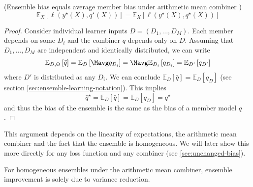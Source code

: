 \documentclass[
	twoside=false, %
]{kaobook}
\begin{document}
\begin{lemma} (Ensemble bias equals average member bias under arithmetic mean combiner \cite{louppe_UnderstandingRandomForests_2015})
  \label{thm:ensemble-bias-equals-average-bias}
$$
\mathbb{E}_{X}\left[ \ell(y^\star(X), \bar{q}^\star(X)) \right] 
= \mathbb{E}_{X}\left[ \ell(y^\star(X), q^\star(X)) \right] 
$$
\end{lemma}
\begin{proof}
Consider individual learner inputs $D = (D_{1}, \dots, D_{M})$. Each member depends on some $D_{i}$ and the combiner $\bar{q}$ depends only on $D$. Assuming that $D_{1}, \dots, D_{M}$ are independent and identically distributed, we can write
$$
\mathbb{E}_{D, \Theta}\left[ \bar{q} \right] = \mathbb{E}_{D}\left[ \Mavg q_{D_{i}} \right] = \Mavg \mathbb{E}_{D_{i}}\left[ q_{D_{i}} \right] = \mathbb{E}_{D'}\left[ q_{D'} \right]
$$
where $D'$ is distributed as any $D_{i}$. We can conclude $\mathbb{E}_{D}\left[ \bar{q} \right] = \mathbb{E}_{D}\left[ q_{D} \right]$ (see section \ref{sec:ensemble-learning-notation}).
This implies
$$
\bar{q}^\star = \mathbb{E}_{D}\left[ \bar{q} \right]  = \mathbb{E}_{D}\left[ q_{D} \right]  = q^\star
$$
and thus the bias of the ensemble is the same as the bias of a member model $q$.
\end{proof}
This argument depends on the linearity of expectations, the arithmetic mean combiner and the fact that the ensemble is homogeneous. We will later show this more directly for any loss function and any combiner (see \ref{sec:unchanged-bias}).

\begin{corollary}
For homogeneous ensembles under the arithmetic mean combiner, ensemble improvement is solely due to variance reduction.
\end{corollary}
\end{document}
